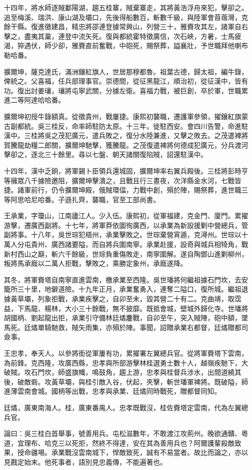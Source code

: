 \begin{pinyinscope}
十四年，將水師逐賊鄱陽湖，趨五桂寨，賊棄寨走，其將黃浩浮舟來犯，擊卻之。追至梅溪、瑞洪、康山湖及壩口，先後得船數百，斬數千級，與陸軍會苜蓿灣，克餘干縣。復進徵建昌，精忠將邵連登據常興山，列營三十，雅賚攻其左，諸軍自右擊之，盡夷其巢，連登中流矢死。復與都統霍特徵廣信，次石峽，方暑，士馬疲渴，猝遇伏，師少卻，雅賚直前奮戰，中砲死，賜祭葬，謚襄壯，予世職拜他喇布勒哈番。

擴爾坤，薩克達氏，滿洲鑲紅旗人，世居那穆都魯。祖葉古德，歸太祖，編牛錄，俾統之。父喜福，任兵部理事官。崇德間，從征黑龍江，順治初，從征漢中，皆有功。復出討姜瓖，瓖將屯寧武關，分據左衛。喜福力戰，被巨創，卒於軍，世職累進二等阿達哈哈番。

擴爾坤初授牛錄額真。從徵貴州，戰屢捷。康熙初襲職，遷護軍參領，擢鑲紅旗蒙古副都統。吳三桂反，命率師駐防太原。十三年，徙駐西安。會四川告警，命進駐漢中。三桂將吳之茂犯廣元，遣兵敗之，復分水陸兼進，又擊之敗去。之茂遣裨將賀騰龍劫糧二郎關，擴爾坤馳擊，獲騰龍。之茂復遣裨將何德成犯廣元，分兵渡河擊卻之，逐北三十餘里。尋以七盤、朝天諸關復陷賊，詔還駐漢中。

十四年，漢中乏餉，將軍錫卜臣領兵還城固，擴爾坤率右翼兵殿後。三桂將彭時亨等擁眾八千據險邀阻，擴爾坤擊潰之，且戰且行三晝夜，次洋縣金水河，七戰皆捷。諸軍前行，仍令擴爾坤殿，俄賊環偪，力戰中創，殞於陣，賜祭葬，進世職三等阿思哈尼哈番。子遜扎齊，襲職，官至工部尚書。

王承業，字瓊山，江南廬江人。少入伍。康熙初，從軍福建，克金門、廈門。累擢游擊，遷廣西副將。十七年，將軍莽依圖徇廣西，以承業為新設援剿中營總兵，管副將事。十八年，吳世琮犯梧州，承業擊敗之。世琮棄營宵遁，克潯州。世琮以十萬人分屯貴州、廣西諸要隘，而自將兵圍南寧。承業赴援，設奇與城兵相犄角，戰新村西山之巔，斬六千餘級，世琮負重傷敗走，南寧圍解。遂自陶鄧山進剿柳州，叛將馬承廕以二萬人拒戰，擊敗之，乘勝定象州，承廕遂降。

其冬，將軍賚塔自南寧直進雲南，檄承業至西隆。吳世璠將何繼祖據石門坎，去安籠所三十里，地僻道險。十九年正月，承業奮勇入，連奪二隘口，復所城。繼祖退據黃草壩，列象拒戰，承業疾擊之，自卯至未，毀其營二十有二。克曲靖，取霑益，下馬龍、楊林，大小三十餘戰，無不披靡。既抵會城，壁城外歸化寺。世璠將胡國柄、劉起龍出拒，承業引守備林廷燏鏖戰，自卯至午，突入賊陣，砲中額，墜馬死。廷燏單騎馳救，賊矢雨集，亦殞於陣。事聞，詔贈承業右都督，廷燏贈都司僉事。

王忠孝，奉天人。以參將銜從軍屢有功，累擢署左翼總兵官。從將軍賚塔下雲南，為前鋒。克西隆，攻廣西縣，忠孝與所部游擊林桂選勇士數十人，越嶺疾馳下，大破賊。攻石門坎，師盛旗幟，鳴鼓角，趨上游，忠孝與桂督兵涉水，出間道繞其後，破敵砦。攻黃草壩，與桂引敵入谷，伏起，夾擊，斬世璠軍裨將。既破隘，師進薄雲南會城。國柄等出戰，忠孝與承業、廷燏同時戰死，贈都督同知。

廷燏，廣東南海人。桂，廣東番禺人。忠孝既戰沒，桂佐賚塔定雲南，代為左翼總兵官。

論曰：吳三桂白首舉事，號善用兵。屯松滋數年，不敢渡江攻荊州。晚欲通贛、粵道，宜理布、哈克三以死拒，然終不得達，安在其為善用兵也？阿爾護輩殺敵致果，授命疆埸。承業戰沒雲南城下，悍敵致死，誠有不易當者。故比而論之，亦以見戡定始末。他死事者，語別見忠義傳，不能遍著也。


\end{pinyinscope}